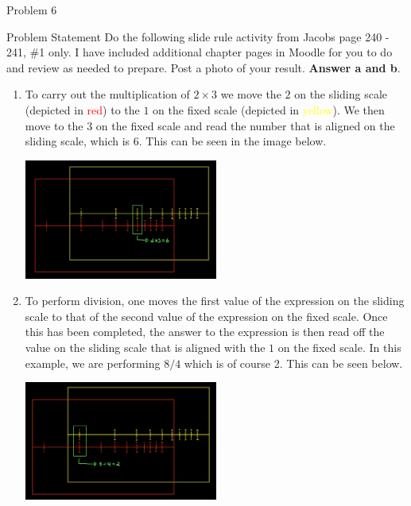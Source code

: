 \begin{problem}{Problem 6}
    \begin{statement}{Problem Statement}
        Do the following slide rule activity from Jacobs page 240 - 241, \#1 only. I have included additional chapter pages in Moodle for you to do and review as needed to prepare. Post a photo of your 
        result. \textbf{Answer a and b}.

    \end{statement}

    \begin{highlight}[Solution]
        \begin{enumerate}[label=(\alph*)]
            \item To carry out the multiplication of $2 \times 3$ we move the $2$ on the sliding scale (depicted in \textcolor{red}{red}) to the $1$ on the fixed scale (depicted in \textcolor{yellow}{yellow}).
            We then move to the $3$ on the fixed scale and read the number that is aligned on the sliding scale, which is $6$. This can be seen in the image below.
            \begin{center}
                \includegraphics[width = 0.5\textwidth]{./Images/Slide Rule Multiplication.png}
            \end{center}
            \item To perform division, one moves the first value of the expression on the sliding scale to that of the second value of the expression on the fixed scale. Once this has been completed, the answer
            to the expression is then read off the value on the sliding scale that is aligned with the $1$ on the fixed scale. In this example, we are performing $8 / 4$ which is of course 2. This can be seen below.
            \begin{center}
                \includegraphics[width = 0.5\textwidth]{./Images/Slide Rule Division.png}
            \end{center}
        \end{enumerate}
    \end{highlight}
\end{problem}


